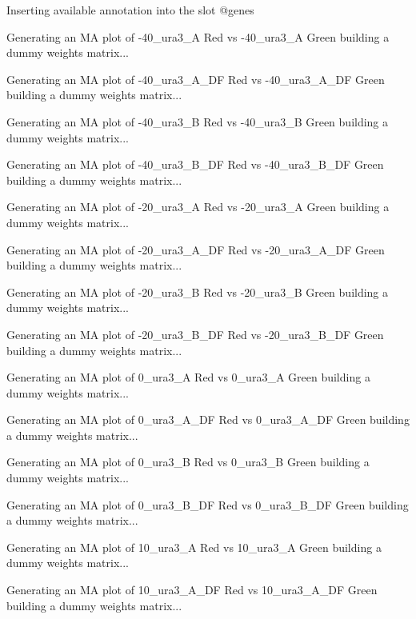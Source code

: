 \documentclass[titlepage]{article}
\begin{document}
\begin{Schunk}
\begin{Soutput}
Inserting available annotation into the slot @genes
\end{Soutput}
\begin{Soutput}
Generating an MA plot of  -40_ura3_A Red vs -40_ura3_A Green 
building a dummy weights matrix... 

Generating an MA plot of  -40_ura3_A_DF Red vs -40_ura3_A_DF Green 
building a dummy weights matrix... 

Generating an MA plot of  -40_ura3_B Red vs -40_ura3_B Green 
building a dummy weights matrix... 

Generating an MA plot of  -40_ura3_B_DF Red vs -40_ura3_B_DF Green 
building a dummy weights matrix... 

Generating an MA plot of  -20_ura3_A Red vs -20_ura3_A Green 
building a dummy weights matrix... 

Generating an MA plot of  -20_ura3_A_DF Red vs -20_ura3_A_DF Green 
building a dummy weights matrix... 

Generating an MA plot of  -20_ura3_B Red vs -20_ura3_B Green 
building a dummy weights matrix... 

Generating an MA plot of  -20_ura3_B_DF Red vs -20_ura3_B_DF Green 
building a dummy weights matrix... 

Generating an MA plot of  0_ura3_A Red vs 0_ura3_A Green 
building a dummy weights matrix... 

Generating an MA plot of  0_ura3_A_DF Red vs 0_ura3_A_DF Green 
building a dummy weights matrix... 

Generating an MA plot of  0_ura3_B Red vs 0_ura3_B Green 
building a dummy weights matrix... 

Generating an MA plot of  0_ura3_B_DF Red vs 0_ura3_B_DF Green 
building a dummy weights matrix... 

Generating an MA plot of  10_ura3_A Red vs 10_ura3_A Green 
building a dummy weights matrix... 

Generating an MA plot of  10_ura3_A_DF Red vs 10_ura3_A_DF Green 
building a dummy weights matrix... 


\end{Soutput}
\end{Schunk}
\end{document}
